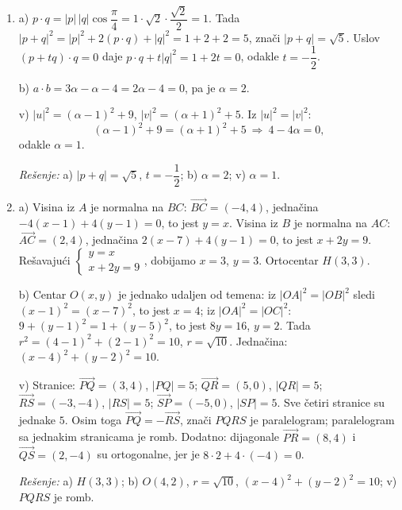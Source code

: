 \begin{enumerate}[label=\arabic*.]
b) Vektori su komplanarni ako i samo ako je njihov mešoviti proizvod jednak nuli:
\[\begin{vmatrix}1&2&-1\\ 2&-1&3\\ \lambda&1&2\end{vmatrix}=1(-2-3)-2(4-3\lambda)+(-1)(2+\lambda)=5\lambda-15.\]
Iz $5\lambda-15=0$ dobijamo $\lambda=3$.

v) Kolinearnost znači proporcionalnost koordinata: $\dfrac{2}{-4}=\dfrac{-3}{6}=\dfrac{k}{10}$. Zajednička vrednost prva dva odnosa jednaka je $-\dfrac12$, pa je $\dfrac{k}{10}=-\dfrac12$, odakle $k=-5$.

\textit{Rešenje:} a) $S=3\sqrt3$; b) $\lambda=3$; v) $k=-5$.

\item a) $p\cdot q=|p|\,|q|\cos\dfrac{\pi}{4}=1\cdot\sqrt2\cdot\dfrac{\sqrt2}{2}=1$. Tada $|p+q|^2=|p|^2+2(p\cdot q)+|q|^2=1+2+2=5$, znači $|p+q|=\sqrt5$. Uslov $(p+tq)\cdot q=0$ daje $p\cdot q+t|q|^2=1+2t=0$, odakle $t=-\dfrac12$.

b) $a\cdot b=3\alpha-\alpha-4=2\alpha-4=0$, pa je $\alpha=2$.

v) $|u|^2=(\alpha-1)^2+9$, $|v|^2=(\alpha+1)^2+5$. Iz $|u|^2=|v|^2$:
\[(\alpha-1)^2+9=(\alpha+1)^2+5\ \Rightarrow\ 4-4\alpha=0,\]
odakle $\alpha=1$.

\textit{Rešenje:} a) $|p+q|=\sqrt5$, $t=-\dfrac12$; b) $\alpha=2$; v) $\alpha=1$.

\item a) Visina iz $A$ je normalna na $BC$: $\overrightarrow{BC}=(-4,4)$, jednačina $-4(x-1)+4(y-1)=0$, to jest $y=x$. Visina iz $B$ je normalna na $AC$: $\overrightarrow{AC}=(2,4)$, jednačina $2(x-7)+4(y-1)=0$, to jest $x+2y=9$. Rešavajući $\begin{cases}y=x\\ x+2y=9\end{cases}$, dobijamo $x=3$, $y=3$. Ortocentar $H(3,3)$.

b) Centar $O(x,y)$ je jednako udaljen od temena: iz $|OA|^2=|OB|^2$ sledi $(x-1)^2=(x-7)^2$, to jest $x=4$; iz $|OA|^2=|OC|^2$: $9+(y-1)^2=1+(y-5)^2$, to jest $8y=16$, $y=2$. Tada $r^2=(4-1)^2+(2-1)^2=10$, $r=\sqrt{10}$. Jednačina: $(x-4)^2+(y-2)^2=10$.

v) Stranice: $\overrightarrow{PQ}=(3,4)$, $|PQ|=5$; $\overrightarrow{QR}=(5,0)$, $|QR|=5$; $\overrightarrow{RS}=(-3,-4)$, $|RS|=5$; $\overrightarrow{SP}=(-5,0)$, $|SP|=5$. Sve četiri stranice su jednake $5$. Osim toga $\overrightarrow{PQ}=-\overrightarrow{RS}$, znači $PQRS$ je paralelogram; paralelogram sa jednakim stranicama je romb. Dodatno: dijagonale $\overrightarrow{PR}=(8,4)$ i $\overrightarrow{QS}=(2,-4)$ su ortogonalne, jer je $8\cdot2+4\cdot(-4)=0$.

\textit{Rešenje:} a) $H(3,3)$; b) $O(4,2)$, $r=\sqrt{10}$, $(x-4)^2+(y-2)^2=10$; v) $PQRS$ je romb.

\end{enumerate}
\clearpage
